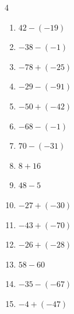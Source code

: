 \begin{multicols}{4}
\begin{enumerate}
        \phantom{$=30$}

  \item $42-(-19)$

        \phantom{$=61$}

  \item $-38-(-1)$

        \phantom{$=-37$}

  \item $-78+(-25)$

        \phantom{$=-103$}

  \item $-29-(-91)$

        \phantom{$=62$}

  \item $-50+(-42)$

        \phantom{$=-92$}

  \item $-68-(-1)$

        \phantom{$=-67$}

  \item $70-(-31)$

        \phantom{$=101$}

  \item $8+16$

        \phantom{$=24$}

  \item $48-5$

        \phantom{$=43$}

  \item $-27+(-30)$

        \phantom{$=-57$}

  \item $-43+(-70)$

        \phantom{$=-113$}

  \item $-26+(-28)$

        \phantom{$=-54$}

  \item $58-60$

        \phantom{$=-2$}

  \item $-35-(-67)$

        \phantom{$=32$}

\columnbreak %

  \item $-4+(-47)$

        \phantom{$=-51$}


\end{enumerate}
\end{multicols}

